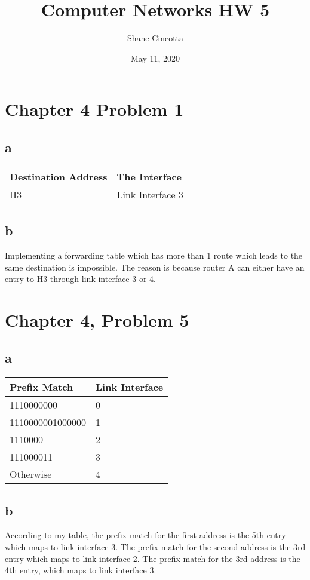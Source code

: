 \documentclass{article}
\title{Computer Networks HW 5}
\author{Shane Cincotta }
\date{May 11, 2020}
\begin{document}
\maketitle

\section*{Chapter 4 Problem 1}
\subsection*{a}
\begin{tabular}{ |l|l| }
  \hline
  Destination Address & The Interface \\ \hline
  H3 & Link Interface 3 \\ \hline
\end{tabular}
\subsection*{b}
Implementing a forwarding table which has more than 1 route which leads to the same destination is impossible.  The reason is because router A can either have an entry to H3 through link interface 3 or 4.\\

\section*{Chapter 4, Problem 5}
\subsection*{a}
\begin{tabular}{ |l|l| }
  \hline
  Prefix Match & Link Interface \\ \hline
  1110000000 & 0 \\ \hline
  1110000001000000 & 1 \\ \hline
  1110000 & 2 \\ \hline
  111000011 & 3 \\ \hline
  Otherwise & 4 \\ \hline
\end{tabular}

\subsection*{b}
According to my table, the prefix match for the first address is the 5th entry which maps to link interface 3.  The prefix match for the second address is the 3rd entry which maps to link interface 2.  The prefix match for the 3rd address is the 4th entry, which maps to link interface 3.\\
\end{document}
